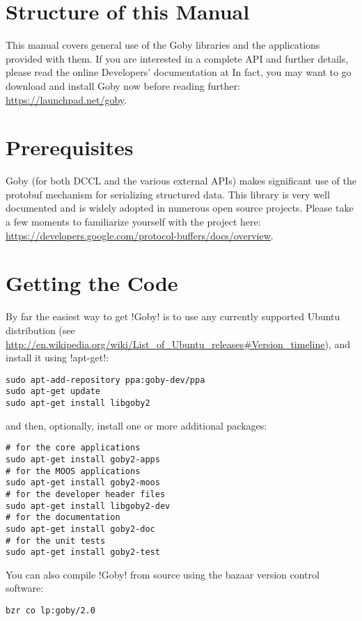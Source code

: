 \section{Structure of this Manual}
This manual covers general use of the Goby libraries and the applications provided with them. If you are interested in a complete API and further details, please read the online Developers' documentation at \cite{goby-doc} In fact, you may want to go download and install Goby now before reading further: \url{https://launchpad.net/goby}.

\section{Prerequisites}
Goby (for both DCCL and the various external APIs) makes significant use of the \gls{protobuf} mechanism for serializing structured data. This library is very well documented and is widely adopted in numerous open source projects. Please take a few moments to familiarize yourself with the project here: \url{https://developers.google.com/protocol-buffers/docs/overview}.


\section{Getting the Code}

By far the easiest way to get !Goby! is to use any currently supported Ubuntu distribution (see \url{http://en.wikipedia.org/wiki/List_of_Ubuntu_releases#Version_timeline}), and install it using !apt-get!:

\begin{verbatim}
sudo apt-add-repository ppa:goby-dev/ppa
sudo apt-get update
sudo apt-get install libgoby2
\end{verbatim}
and then, optionally, install one or more additional packages:
\begin{verbatim}
# for the core applications
sudo apt-get install goby2-apps
# for the MOOS applications
sudo apt-get install goby2-moos
# for the developer header files
sudo apt-get install libgoby2-dev
# for the documentation
sudo apt-get install goby2-doc
# for the unit tests
sudo apt-get install goby2-test
\end{verbatim}


You can also compile !Goby! from source using the bazaar version control software:

\begin{verbatim}
bzr co lp:goby/2.0
\end{verbatim}

